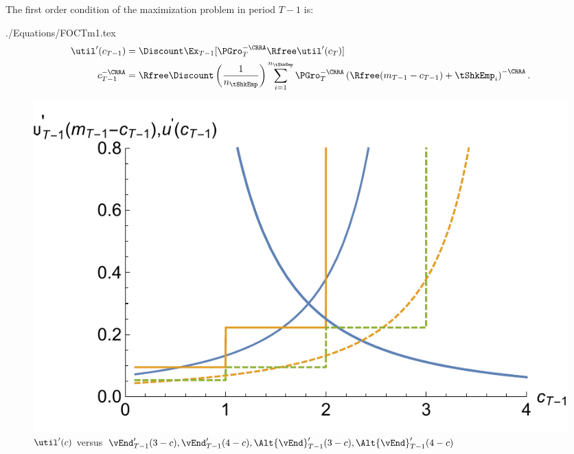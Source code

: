 \documentclass[titlepage]{\econtex}
\begin{document}
The first order condition of the maximization problem in period $T-1$ is:
\begin{verbatimwrite}{./Equations/FOCTm1.tex}
  \begin{equation}\begin{gathered}\begin{aligned}
    \util^{\prime}({c}_{T-1})       & = \Discount \Ex_{T-1} [\PGro_{T}^{-\CRRA}\Rfree \util^{\prime}({c}_{T})]  \label{eq:focraw}
    \\      {c}_{T-1}^{-\CRRA}   & = \Rfree \Discount \left(\frac{1}{n_{\tShkEmp}}\right) \sum_{i=1}^{n_{\tShkEmp}} \PGro_{T}^{-\CRRA}\left(\Rfree ({m}_{T-1}-{c}_{T-1}) + \tShkEmp_{i}\right)^{-\CRRA} \label{eq:FOCTm1}.
  \end{aligned}\end{gathered}\end{equation}
\end{verbatimwrite}

\hypertarget{PlotuPrimeVSOPrime}{}
\begin{figure}
  \includegraphics{./Figures/PlotuPrimeVSOPrime}
  \caption{$\util^{\prime}(c)$ versus $\vEnd_{T-1}^{\prime}(3-c), \vEnd_{T-1}^{\prime}(4-c), \Alt{\vEnd}_{T-1}^{\prime}(3-c), \Alt{\vEnd}_{T-1}^{\prime}(4-c)$}
  \label{fig:PlotuPrimeVSOPrime}
\end{figure}
\end{document}

